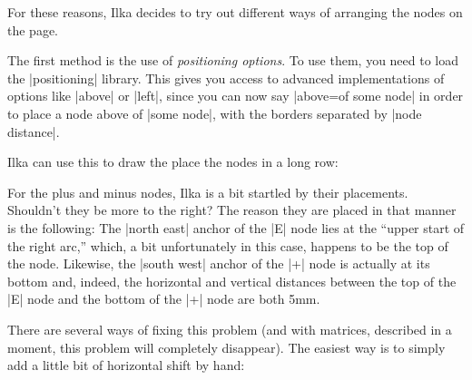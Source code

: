 For these reasons, Ilka decides to try out different ways of arranging
the nodes on the page.

The first method is the use of \emph{positioning options}. To use
them, you need to load the |positioning| library. This gives you
access to advanced implementations of options like |above| or |left|,
since you can now say |above=of some node| in order to place a node
above of |some node|, with the borders separated by |node distance|.

Ilka can use this to draw the place the nodes in a long row:
\begin{codeexample}[]
\end{codeexample}

For the plus and minus nodes, Ilka is a bit startled by their
placements. Shouldn't they be more to the right? The reason they are
placed in that manner is the following: The |north east| anchor of the
|E| node lies at the ``upper start of the right arc,'' which, a bit
unfortunately in this case, happens to be the top of the
node. Likewise, the |south west| anchor of the |+| node is actually at
its bottom and, indeed, the horizontal and vertical distances between
the top of the |E| node and the bottom of the |+| node are both 5mm.

There are several ways of fixing this problem (and with matrices,
described in a moment, this problem will completely disappear). The
easiest way is to simply add a little bit of horizontal shift by hand:
\begin{codeexample}[]
\end{codeexample}


